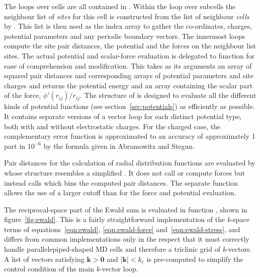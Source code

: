 \documentclass[a4paper,twoside]{report}
\newcommand{\bm}[1]{\mathbf{#1}}
\begin{document}
The loops over cells are all contained in .
Within the loop over subcells the neighbour list of \emph{sites} for
this cell is constructed from the list of neighbour \emph{cells} by
.  This list is then used as the index
array to gather the co-ordinates, charges, potential parameters and
any periodic boundary vectors.  The innermost loops compute the site
pair distances, the potential and the forces on the neighbour list
sites.  The actual potential and scalar-force evaluation is delegated
to function  for ease of comprehension and modification.
This takes as its arguments an array of squared pair distances and
corresponding arrays of potential parameters and site charges and
returns the potential energy and an array containing the scalar part
of the force, $\phi'(r_{ij})/r_{ij}$. The structure of 
is designed to evaluate all the different kinds of potential functions
(see section~\ref{sec:potentials}) as efficiently as possible.  It
contains separate versions of a vector loop for each distinct
potential type, both with and without electrostatic charges.  For the
charged case, the complementary error function is approximated to an
accuracy of approximately 1 part in $10^{-6}$ by the formula given in
Abramowitz and Stegun\cite[section 7.1.26]{abramowitz:70}.

Pair distances for the calculation of radial distribution functions
are evaluated by  whose structure
resembles a simplified . It does not call
 or compute forces but instead calls
 which bins the computed pair distances. The
separate function allows the use of a larger cutoff than for the force
and potential evaluation.

The reciprocal-space part of the Ewald sum is evaluated in function
, shown in figure~\ref{fig:ewald}.  This is a fairly
straightforward implementation of the \emph{k}-space terms of
equations~\ref{eqn:ewald}, \ref{eqn:ewald-force}
and~\ref{eqn:ewald-stress}, and differs from common implementations
only in the respect that it must correctly handle
parallelepiped-shaped MD cells and therefore a triclinic grid of
\emph{k}-vectors.  A list of vectors satisfying $\bm{k} > \bm{0}$ and
$|\bm{k}| < k_c$ is pre-computed to simplify the control condition of
the main \emph{k}-vector loop.
\end{document}
